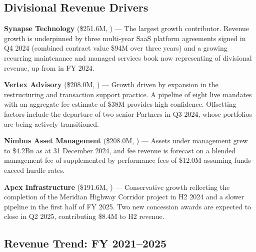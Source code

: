 \subsection{Divisional Revenue Drivers}

\textbf{Synapse Technology} (\$251.6M, ) — The largest growth
contributor. Revenue growth is underpinned by three multi-year SaaS platform
agreements signed in Q4 2024 (combined contract value \$94M over three years) and a
growing recurring maintenance and managed services book now representing 
of divisional revenue, up from  in FY 2024.

\textbf{Vertex Advisory} (\$208.0M, ) — Growth driven by expansion in
the restructuring and transaction support practice. A pipeline of eight live mandates
with an aggregate fee estimate of \$38M provides high confidence. Offsetting factors
include the departure of two senior Partners in Q3 2024, whose portfolios are being
actively transitioned.

\textbf{Nimbus Asset Management} (\$208.0M, ) — Assets under management
grew to \$4.2Bn as at 31 December 2024, and fee revenue is forecast on a blended
management fee of  supplemented by performance fees of \$12.0M assuming
funds exceed hurdle rates.

\textbf{Apex Infrastructure} (\$191.6M, ) — Conservative growth
reflecting the completion of the Meridian Highway Corridor project in H2 2024 and a
slower pipeline in the first half of FY 2025. Two new concession awards are expected
to close in Q2 2025, contributing \$8.4M to H2 revenue.

\subsection{Revenue Trend: FY 2021--2025}

